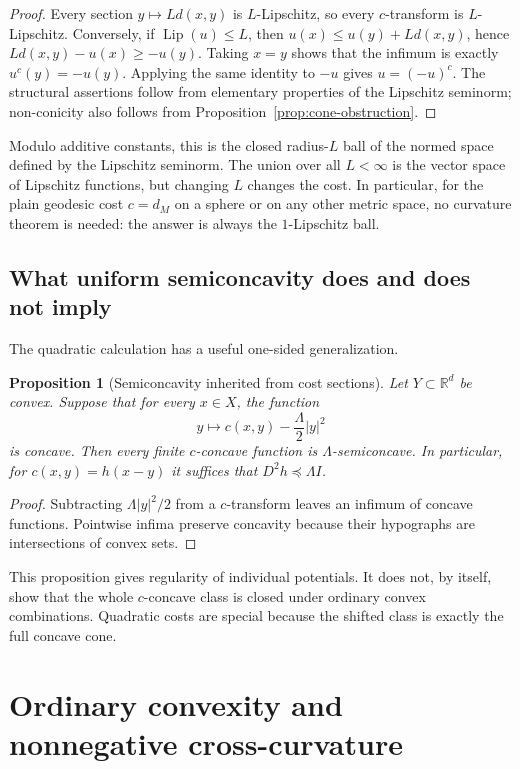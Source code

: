 \documentclass[11pt,a4paper]{article}
\newtheorem{proposition}[theorem]{Proposition}
\theoremstyle{definition}
\theoremstyle{remark}
\newcommand{\R}{\mathbb R}
\newcommand{\Lip}{\operatorname{Lip}}
\begin{document}
\begin{proof}
Every section $y\mapsto Ld(x,y)$ is $L$-Lipschitz, so every $c$-transform is
$L$-Lipschitz. Conversely, if $\Lip(u)\leq L$, then
$u(x)\leq u(y)+Ld(x,y)$, hence $Ld(x,y)-u(x)\geq-u(y)$. Taking $x=y$ shows
that the infimum is exactly $u^c(y)=-u(y)$. Applying the same identity to $-u$
gives $u=(-u)^c$. The structural assertions follow from elementary properties
of the Lipschitz seminorm; non-conicity also follows from
Proposition~\ref{prop:cone-obstruction}.
\end{proof}

Modulo additive constants, this is the closed radius-$L$ ball of the normed
space defined by the Lipschitz seminorm. The union over all $L<\infty$ is the
vector space of Lipschitz functions, but changing $L$ changes the cost. In
particular, for the plain geodesic cost $c=d_M$ on a sphere or on any other
metric space, no curvature theorem is needed: the answer is always the
$1$-Lipschitz ball.

\subsection{What uniform semiconcavity does and does not imply}

The quadratic calculation has a useful one-sided generalization.

\begin{proposition}[Semiconcavity inherited from cost sections]\label{prop:section-semiconcavity}
Let $Y\subset\R^d$ be convex. Suppose that for every $x\in X$, the function
\[
  y\longmapsto c(x,y)-\frac{\Lambda}{2}\lvert y\rvert^2
\]
is concave. Then every finite $c$-concave function is $\Lambda$-semiconcave.
In particular, for $c(x,y)=h(x-y)$ it suffices that
$D^2h\preccurlyeq\Lambda I$.
\end{proposition}

\begin{proof}
Subtracting $\Lambda\lvert y\rvert^2/2$ from a $c$-transform leaves an
infimum of concave functions. Pointwise infima preserve concavity because their
hypographs are intersections of convex sets.
\end{proof}

This proposition gives regularity of individual potentials. It does not, by
itself, show that the whole $c$-concave class is closed under ordinary convex
combinations. Quadratic costs are special because the shifted class is exactly
the full concave cone.

\section{Ordinary convexity and nonnegative cross-curvature}
\end{document}
